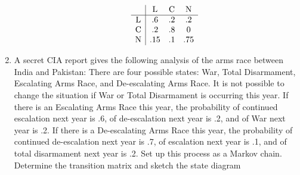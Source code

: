 \documentclass{hw}
\begin{document}
\begin{enumerate}
\begin{enumerate}
\begin{minipage}{0.5\textwidth}
\[
\begin{array}{c | c c c}
& \text{L} & \text{C} & \text{N}\\
\hline
\text{L} & .6 & .2 & .2\\
\text{C} & .2 & .8 & 0\\
\text{N} & .15 & .1 & .75
\end{array}
\]
\end{minipage}
\begin{minipage}{0.5\textwidth}
\begin{center}
\end{center}
\end{minipage}
\end{enumerate}

\item A secret CIA report gives the following analysis of the arms race between India and Pakistan:
There are four possible states: War, Total Disarmament, Escalating Arms Race, and De-escalating
Arms Race. It is not possible to change the situation if War or Total Disarmament is occurring this
year. If there is an Escalating Arms Race this year, the probability of continued escalation next
year is .6, of de-escalation next year is .2, and of War next year is .2. If there is a
De-escalating Arms Race this year, the probability of continued de-escalation next year is .7, of
escalation next year is .1, and of total disarmament next year is .2. Set up this process as a
Markov chain. Determine the transition matrix and sketch the state diagram


\end{enumerate}
\end{document}
